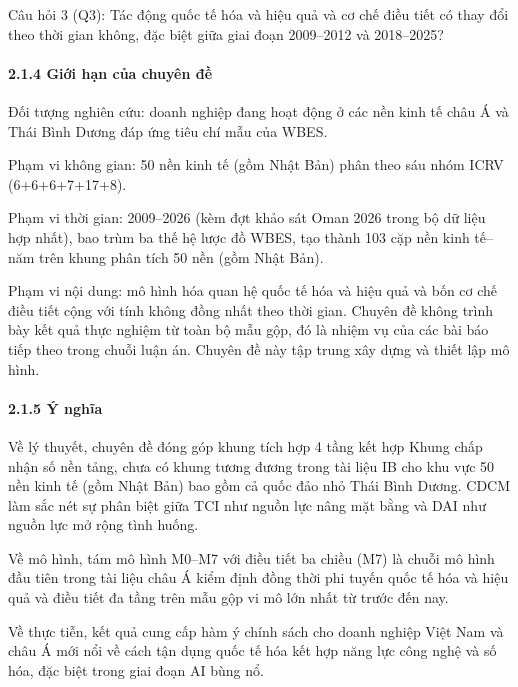 \documentclass[
  a4paper,
  13pt]{extreport}
\begin{document}
Câu hỏi 3 (Q3): Tác động quốc tế hóa và hiệu quả và cơ chế điều tiết có
thay đổi theo thời gian không, đặc biệt giữa giai đoạn 2009--2012 và
2018--2025?

\hypertarget{giux1edbi-hux1ea1n-cux1ee7a-chuyuxean-ux111ux1ec1}{%
\paragraph{2.1.4 Giới hạn của chuyên
đề}\label{giux1edbi-hux1ea1n-cux1ee7a-chuyuxean-ux111ux1ec1}}

Đối tượng nghiên cứu: doanh nghiệp đang hoạt động ở các nền kinh tế châu
Á và Thái Bình Dương đáp ứng tiêu chí mẫu của WBES.

Phạm vi không gian: 50 nền kinh tế (gồm Nhật Bản) phân theo sáu nhóm
ICRV (6+6+6+7+17+8).

Phạm vi thời gian: 2009--2026 (kèm đợt khảo sát Oman 2026 trong bộ dữ
liệu hợp nhất), bao trùm ba thế hệ lược đồ WBES, tạo thành 103 cặp nền
kinh tế--năm trên khung phân tích 50 nền (gồm Nhật Bản).

Phạm vi nội dung: mô hình hóa quan hệ quốc tế hóa và hiệu quả và bốn cơ
chế điều tiết cộng với tính không đồng nhất theo thời gian. Chuyên đề
không trình bày kết quả thực nghiệm từ toàn bộ mẫu gộp, đó là nhiệm vụ
của các bài báo tiếp theo trong chuỗi luận án. Chuyên đề này tập trung
xây dựng và thiết lập mô hình.

\hypertarget{uxfd-nghux129a}{%
\paragraph{2.1.5 Ý nghĩa}\label{uxfd-nghux129a}}

Về lý thuyết, chuyên đề đóng góp khung tích hợp 4 tầng kết hợp Khung
chấp nhận số nền tảng, chưa có khung tương đương trong tài liệu IB cho
khu vực 50 nền kinh tế (gồm Nhật Bản) bao gồm cả quốc đảo nhỏ Thái Bình
Dương. CDCM làm sắc nét sự phân biệt giữa TCI như nguồn lực nâng mặt
bằng và DAI như nguồn lực mở rộng tình huống.

Về mô hình, tám mô hình M0--M7 với điều tiết ba chiều (M7) là chuỗi mô
hình đầu tiên trong tài liệu châu Á kiểm định đồng thời phi tuyến quốc
tế hóa và hiệu quả và điều tiết đa tầng trên mẫu gộp vi mô lớn nhất từ
trước đến nay.

Về thực tiễn, kết quả cung cấp hàm ý chính sách cho doanh nghiệp Việt
Nam và châu Á mới nổi về cách tận dụng quốc tế hóa kết hợp năng lực công
nghệ và số hóa, đặc biệt trong giai đoạn AI bùng nổ.
\end{document}
